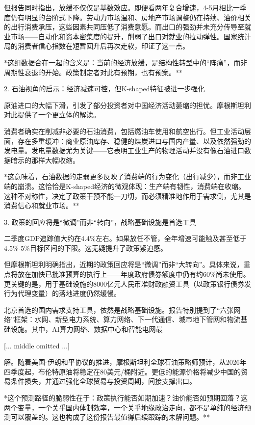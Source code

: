 \documentclass[11pt]{ctexart}
\begin{document}
但报告同时指出，放缓不仅仅是基数效应。即便看两年复合增速，4-5月相比一季度仍有明显的台阶式下降。劳动力市场温和、房地产市场调整仍在持续、油价相关的出行消费承压，这些因素共同压低了消费意愿。而出口的强劲并未充分传导至就业市场——自动化和资本密集度的提升，削弱了出口对就业的拉动弹性。国家统计局的消费者信心指数在短暂回升后再次走软，印证了这一点。

*这组数据合在一起的含义是：当前的经济放缓，是结构性转型中的“阵痛”，而非周期性衰退的开始。政策制定者对此有预期，也有预案。**

2. 石油视角的启示：经济减速可控，但K-shaped特征被进一步强化

原油进口的大幅下滑，引发了部分投资者对中国经济活动萎缩的担忧。摩根斯坦利对此提供了一个更立体的解读。

消费者确实在削减非必要的石油消费，包括燃油车使用和航空出行。但工业活动层面，存在多重缓冲：商业原油库存、稳健的煤炭进口与国内产量、以及依然强劲的发电量。发电量数据尤为关键——它表明工业生产的物理活动并没有像石油进口数据暗示的那样大幅收缩。

*这意味着，石油数据的走弱更多反映了消费端的行为变化（出行减少），而非工业端的崩溃。这恰恰是K-shaped经济的微观体现：生产端有韧性，消费端在收缩。这种不对称性，决定了政策干预不能一刀切，而必须精准地作用于需求侧，尤其是消费信心和就业市场。**

3. 政策的回应将是“微调”而非“转向”，战略基础设施是首选工具

二季度GDP追踪值大约在4.4\%左右。如果放任不管，全年增速可能触及甚至低于4.5\%-5\%目标区间的下限。这无疑提升了政策紧迫感。

但摩根斯坦利明确指出，近期的政策回应将是“微调”而非“大转向”。具体来说，重点将放在加快已批准预算的执行上——年度政府债券额度中仍有约60\%尚未使用。更关键的是，用于基础设施的8000亿元人民币准财政融资工具（以政策银行债券发行为代理变量）的落地进度仍然缓慢。

北京首选的国内需求支持工具，依然是战略基础设施。报告特别提到了“六张网络”框架：水网、新型电力系统、算力网络、下一代通信、城市地下管网和物流基础设施。其中，AI算力网络、数据中心和智能电网最

[... middle omitted ...]

解。随着美国-伊朗和平协议的推进，摩根斯坦利全球石油策略师预计，从2026年四季度起，布伦特原油将稳定在80美元/桶附近。更低的能源价格将减少中国的贸易条件损失，并通过强化全球贸易与投资周期，间接支撑出口。

*这个预测路径的脆弱性在于：政策执行能否如期加速？油价能否如预期回落？这两个变量，一个关乎国内体制效率，一个关乎地缘政治走向，都不是单纯的经济预测可以覆盖的。这也构成了这份报告最值得后续跟踪的未解问题。**
\end{document}
